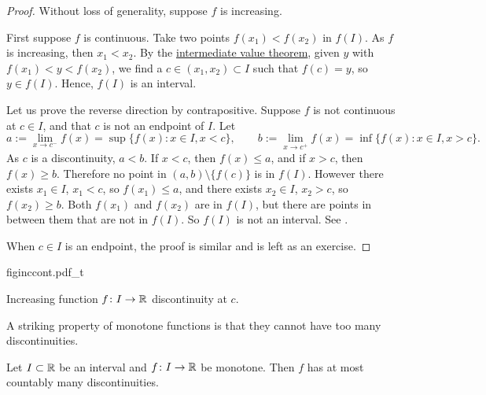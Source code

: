 \begin{proof}
Without loss of generality, suppose $f$ is increasing.

First suppose $f$ is continuous.  Take two points
$f(x_1) < f(x_2)$ in $f(I)$.
As $f$ is increasing, then $x_1 < x_2$.  By the
\hyperref[IVT:thm]{intermediate value theorem},
given $y$ with $f(x_1) < y < f(x_2)$, we find
a $c \in (x_1,x_2) \subset I$ such that $f(c) = y$, so $y \in f(I)$. 
Hence, $f(I)$ is an interval.

Let us prove the reverse direction by contrapositive.
Suppose $f$ is not continuous at $c \in I$,
and that $c$ is not an endpoint of $I$.
Let
\begin{equation*}
a := \lim_{x \to c^-} f(x) = \sup \bigl\{ f(x) : x \in I, x < c \bigr\} ,
\qquad
b := \lim_{x \to c^+} f(x) = \inf \bigl\{ f(x) : x \in I, x > c \bigr\} .
\end{equation*}
As $c$ is a discontinuity, $a < b$.
If $x < c$, then $f(x) \leq a$, and
if $x > c$, then $f(x) \geq b$.  Therefore
no point
in $(a,b) \setminus \{ f(c) \}$ is in $f(I)$.
However there exists $x_1 \in I$, $x_1 < c$, so
$f(x_1) \leq a$, and there exists $x_2 \in I$, $x_2 > c$,
so $f(x_2) \geq b$.  Both $f(x_1)$ and $f(x_2)$ are in $f(I)$,
but there are points in between them that are not in $f(I)$.
So $f(I)$ is not an interval.  See .

When $c \in I$ is an endpoint, the proof is similar and is left as an exercise.
\end{proof}

\begin{myfigureht}
{figinccont.pdf_t}
\caption{Increasing function $f \colon I \to {\mathbb{R}}$ discontinuity at
$c$.\label{fig:figinccont}}
\end{myfigureht}

A striking property of monotone functions is that they cannot have
too many discontinuities.

\begin{cor} \label{cor:monotcountcont}
Let $I \subset {\mathbb{R}}$ be an interval and
$f \colon I \to {\mathbb{R}}$ be monotone.  Then $f$ has at most
countably many discontinuities.
\end{cor}

